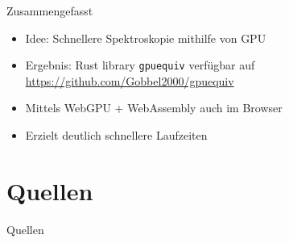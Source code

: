 \documentclass{beamer}
\begin{document}
\begin{frame}{Zusammengefasst}
    \begin{itemize}
        \item Idee: Schnellere Spektroskopie mithilfe von GPU
        \item Ergebnis: Rust library \texttt{gpuequiv} verfügbar auf
            \url{https://github.com/Gobbel2000/gpuequiv}
        \item Mittels WebGPU + WebAssembly auch im Browser
        \item Erzielt deutlich schnellere Laufzeiten
    \end{itemize}
\end{frame}

\section*{Quellen}

\begin{frame}{Quellen}
    \printbibliography
\end{frame}
\end{document}
